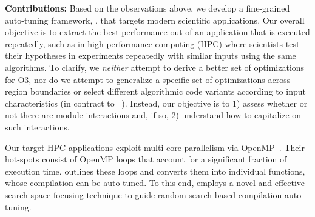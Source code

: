 {\bf Contributions:}
%
Based on the observations above, we develop a fine-grained auto-tuning
framework, \toolname, that targets modern scientific applications.
Our overall objective is to extract the best performance out of an
application that is executed repeatedly, such as in high-performance
computing (HPC) where scientists test their hypotheses in experiments
repeatedly with similar inputs using the same algorithms. 
%
To clarify, we {\em neither} attempt to derive a better set of
optimizations for O3, nor do we attempt to generalize a specific set
of optimizations across region boundaries or select different
algorithmic code variants according to input characteristics (in
contract to ~\cite{jiajia,yeom}). Instead, our objective is to 1)
assess whether or not there are module interactions and, if so, 2)
understand how to capitalize on such interactions.

Our target HPC applications exploit multi-core parallelism via OpenMP~\cite{OpenMP}.
Their hot-spots consist of OpenMP loops that account for a significant
fraction of execution time. \toolname outlines these loops and
converts them into individual functions, whose compilation can be
auto-tuned.  To this end, \toolname employs a novel and effective
search space focusing technique to guide random search based
compilation auto-tuning.

